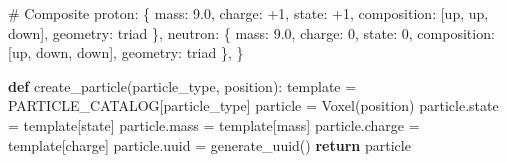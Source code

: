 \documentclass[
  11pt,
  letterpaper,
  twoside,
  openright]{book}
\newenvironment{Shaded}{\begin{snugshade}}{\end{snugshade}}
\newcommand{\CommentTok}[1]{\textcolor[rgb]{0.37,0.37,0.37}{#1}}
\newcommand{\ControlFlowTok}[1]{\textcolor[rgb]{0.00,0.23,0.31}{\textbf{#1}}}
\newcommand{\DecValTok}[1]{\textcolor[rgb]{0.68,0.00,0.00}{#1}}
\newcommand{\FloatTok}[1]{\textcolor[rgb]{0.68,0.00,0.00}{#1}}
\newcommand{\KeywordTok}[1]{\textcolor[rgb]{0.00,0.23,0.31}{\textbf{#1}}}
\newcommand{\NormalTok}[1]{\textcolor[rgb]{0.00,0.23,0.31}{#1}}
\newcommand{\OperatorTok}[1]{\textcolor[rgb]{0.37,0.37,0.37}{#1}}
\newcommand{\StringTok}[1]{\textcolor[rgb]{0.13,0.47,0.30}{#1}}
\begin{document}
\begin{Shaded}
\begin{Highlighting}[]
    \CommentTok{\# Composite}
    \StringTok{\textquotesingle{}proton\textquotesingle{}}\NormalTok{: \{}
        \StringTok{\textquotesingle{}mass\textquotesingle{}}\NormalTok{: }\FloatTok{9.0}\NormalTok{,}
        \StringTok{\textquotesingle{}charge\textquotesingle{}}\NormalTok{: }\OperatorTok{+}\DecValTok{1}\NormalTok{,}
        \StringTok{\textquotesingle{}state\textquotesingle{}}\NormalTok{: }\OperatorTok{+}\DecValTok{1}\NormalTok{,}
        \StringTok{\textquotesingle{}composition\textquotesingle{}}\NormalTok{: [}\StringTok{\textquotesingle{}up\textquotesingle{}}\NormalTok{, }\StringTok{\textquotesingle{}up\textquotesingle{}}\NormalTok{, }\StringTok{\textquotesingle{}down\textquotesingle{}}\NormalTok{],}
        \StringTok{\textquotesingle{}geometry\textquotesingle{}}\NormalTok{: }\StringTok{\textquotesingle{}triad\textquotesingle{}}
\NormalTok{    \},}
    \StringTok{\textquotesingle{}neutron\textquotesingle{}}\NormalTok{: \{}
        \StringTok{\textquotesingle{}mass\textquotesingle{}}\NormalTok{: }\FloatTok{9.0}\NormalTok{,}
        \StringTok{\textquotesingle{}charge\textquotesingle{}}\NormalTok{: }\DecValTok{0}\NormalTok{,}
        \StringTok{\textquotesingle{}state\textquotesingle{}}\NormalTok{: }\DecValTok{0}\NormalTok{,}
        \StringTok{\textquotesingle{}composition\textquotesingle{}}\NormalTok{: [}\StringTok{\textquotesingle{}up\textquotesingle{}}\NormalTok{, }\StringTok{\textquotesingle{}down\textquotesingle{}}\NormalTok{, }\StringTok{\textquotesingle{}down\textquotesingle{}}\NormalTok{],}
        \StringTok{\textquotesingle{}geometry\textquotesingle{}}\NormalTok{: }\StringTok{\textquotesingle{}triad\textquotesingle{}}
\NormalTok{    \},}
\NormalTok{\}}

\KeywordTok{def}\NormalTok{ create\_particle(particle\_type, position):}
\NormalTok{    template }\OperatorTok{=}\NormalTok{ PARTICLE\_CATALOG[particle\_type]}
\NormalTok{    particle }\OperatorTok{=}\NormalTok{ Voxel(position)}
\NormalTok{    particle.state }\OperatorTok{=}\NormalTok{ template[}\StringTok{\textquotesingle{}state\textquotesingle{}}\NormalTok{]}
\NormalTok{    particle.mass }\OperatorTok{=}\NormalTok{ template[}\StringTok{\textquotesingle{}mass\textquotesingle{}}\NormalTok{]}
\NormalTok{    particle.charge }\OperatorTok{=}\NormalTok{ template[}\StringTok{\textquotesingle{}charge\textquotesingle{}}\NormalTok{]}
\NormalTok{    particle.uuid }\OperatorTok{=}\NormalTok{ generate\_uuid()}
    \ControlFlowTok{return}\NormalTok{ particle}
\end{Highlighting}
\end{Shaded}
\end{document}
